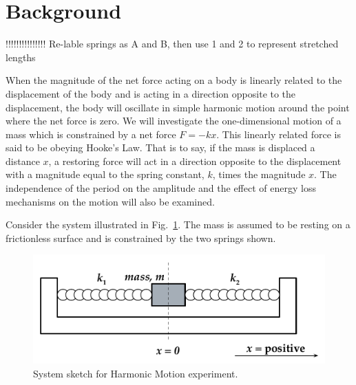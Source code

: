 
\label{lab:M9}

\section{Background}

!!!!!!!!!!!!!!! Re-lable springs as A and B, then use 1 and 2 to represent stretched lengths

When the magnitude of the net force acting on a body is linearly related to the displacement of the body and is acting in a direction opposite to the displacement, the body will oscillate in simple harmonic motion around the point where the net force is zero.  We will investigate the one-dimensional motion of a mass which is constrained by a net force $F = -k x$. This linearly related force is said to be obeying Hooke's Law.  That is to say, if the mass is displaced a distance $x$, a restoring force will act in a direction opposite to the displacement with a magnitude equal to the spring constant, $k$, times the magnitude $x$.  The independence of the period on the amplitude and the effect of energy loss mechanisms on the motion will also be examined.


Consider the system illustrated in Fig.~\ref{M09Fig01}.  The mass is assumed to be resting on a frictionless surface and is constrained by the two springs shown.

\begin{figure}
  \begin{center}
    \includegraphics[width=5.5in]{Experiment07Figures/Figure01.pdf}
  \end{center}
  \caption{System sketch for Harmonic Motion experiment.}
  \label{M09Fig01}  %
\end{figure}

